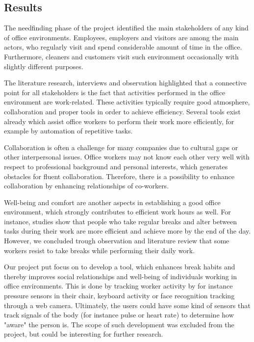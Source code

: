 \subsection{Results}
The needfinding phase of the project identified the main stakeholders of any kind of office environments. Employees, employers and visitors are among the main actors, who regularly visit and spend considerable amount of time in the office. Furthermore, cleaners and customers visit such environment occasionally with slightly different purposes. 

The literature research, interviews and observation highlighted that a connective point for all stakeholders is the fact that activities performed in the office environment are work-related. These activities typically require good atmosphere, collaboration and proper tools in order to achieve efficiency. Several tools exist already which assist office workers to perform their work more efficiently, for example by automation of repetitive tasks. 

Collaboration is often a challenge for many companies due to cultural gaps or other interpersonal issues. Office workers may not know each other very well with respect to professional background and personal interests, which generates obstacles for fluent collaboration. Therefore, there is a possibility to enhance collaboration by enhancing relationships of co-workers.

Well-being and comfort are another aspects in establishing a good office environment, which strongly contributes to efficient work hours as well. For instance, studies show that people who take regular breaks and alter between tasks during their work are more efficient and achieve more by the end of the day. However, we concluded trough observation and literature review that some workers resist to take breaks while performing their daily work. 

Our project put focus on to develop a tool, which enhances break habits and thereby improves social relationships and well-being of individuals working in office environments. This is done by tracking worker activity by for instance pressure sensors in their chair, keyboard activity or face recognition tracking through a web camera. Ultimately, the users could have some kind of sensors that track signals of the body (for instance pulse or heart rate) to determine how "aware" the person is. The scope of such development was excluded from the project, but could be interesting for further research. 

